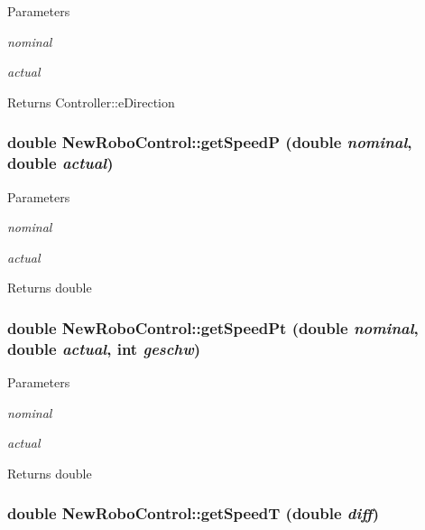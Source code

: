 \begin{DoxyParams}{Parameters}
\item[{\em nominal}]\item[{\em actual}]\end{DoxyParams}
\begin{DoxyReturn}{Returns}
Controller::eDirection 
\end{DoxyReturn}
\hypertarget{classNewRoboControl_ab2f2407b40c535ed734049e8e1ed71e6}{
\subsubsection[{getSpeedP}]{\setlength{\rightskip}{0pt plus 5cm}double NewRoboControl::getSpeedP (double {\em nominal}, \/  double {\em actual})}}
\label{classNewRoboControl_ab2f2407b40c535ed734049e8e1ed71e6}

\begin{DoxyParams}{Parameters}
\item[{\em nominal}]\item[{\em actual}]\end{DoxyParams}
\begin{DoxyReturn}{Returns}
double 
\end{DoxyReturn}
\hypertarget{classNewRoboControl_ac1f5cb8932193d5e8315bb19aeddb3fa}{
\subsubsection[{getSpeedPt}]{\setlength{\rightskip}{0pt plus 5cm}double NewRoboControl::getSpeedPt (double {\em nominal}, \/  double {\em actual}, \/  int {\em geschw})}}
\label{classNewRoboControl_ac1f5cb8932193d5e8315bb19aeddb3fa}

\begin{DoxyParams}{Parameters}
\item[{\em nominal}]\item[{\em actual}]\end{DoxyParams}
\begin{DoxyReturn}{Returns}
double 
\end{DoxyReturn}
\hypertarget{classNewRoboControl_a0c5f29bb2dee1faf96725b80ddc64398}{
\subsubsection[{getSpeedT}]{\setlength{\rightskip}{0pt plus 5cm}double NewRoboControl::getSpeedT (double {\em diff})}}
\label{classNewRoboControl_a0c5f29bb2dee1faf96725b80ddc64398}

